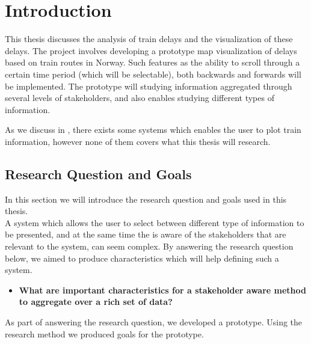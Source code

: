 
\chapter{Introduction}
\label{chapter:introduction}

This thesis discusses the  analysis of train delays and the visualization of 
these delays. The project involves developing a prototype map visualization of 
delays based on train routes in Norway. Such features as the ability to scroll 
through a certain time period (which will be selectable), both backwards and 
forwards will be implemented. The prototype will studying information
aggregated through several levels of stakeholders, and also enables studying
different types of information.

As we discuss in , there exists some systems which 
enables the user to plot train information, however none of them covers what 
this thesis will research.

\section{Research Question and Goals} %
\label{sec:intro_research_question}
In this section we will introduce the research question and goals used in this
thesis.\\



A system which allows the user to select between different type of information
to be presented, and at the same time the is aware of the stakeholders that are
relevant to the system, can seem complex. By answering the research question
below, we aimed to produce characteristics which will help defining such a
system.

\begin{itemize}
	\item \textbf{What are important characteristics for a stakeholder aware 
	method to aggregate over a rich set of data?}
\end{itemize}

As part of answering the research question, we developed a prototype. Using the
research method we produced goals for the prototype.


